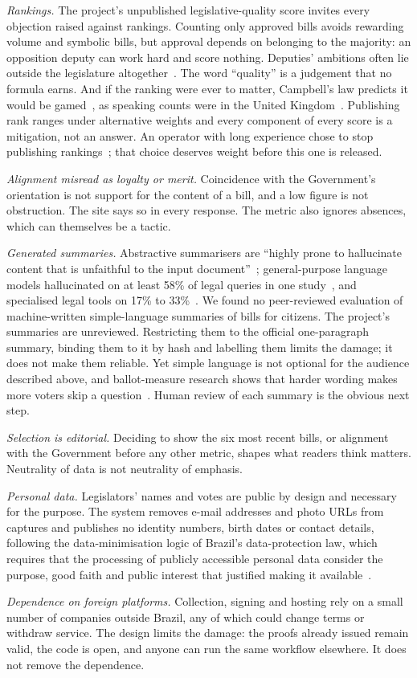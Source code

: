 \emph{Rankings.} The project's unpublished legislative-quality score invites every objection raised against rankings. Counting only approved bills avoids rewarding volume and symbolic bills, but approval depends on belonging to the majority: an opposition deputy can work hard and score nothing. Deputies' ambitions often lie outside the legislature altogether~\citep{samuels2003ambition}. The word ``quality'' is a judgement that no formula earns. And if the ranking were ever to matter, Campbell's law predicts it would be gamed~\citep{campbell1979assessing}, as speaking counts were in the United Kingdom~\citep{korthagen2020parliamentary}. Publishing rank ranges under alternative weights and every component of every score is a mitigation, not an answer. An operator with long experience chose to stop publishing rankings~\citep{parsons2020publishing}; that choice deserves weight before this one is released.

\emph{Alignment misread as loyalty or merit.} Coincidence with the Government's orientation is not support for the content of a bill, and a low figure is not obstruction. The site says so in every response. The metric also ignores absences, which can themselves be a tactic.

\emph{Generated summaries.} Abstractive summarisers are ``highly prone to hallucinate content that is unfaithful to the input document''~\citep{maynez2020faithfulness}; general-purpose language models hallucinated on at least 58\% of legal queries in one study~\citep{dahl2024large}, and specialised legal tools on 17\% to 33\%~\citep{magesh2025hallucination}. We found no peer-reviewed evaluation of machine-written simple-language summaries of bills for citizens. The project's summaries are unreviewed. Restricting them to the official one-paragraph summary, binding them to it by hash and labelling them limits the damage; it does not make them reliable. Yet simple language is not optional for the audience described above, and ballot-measure research shows that harder wording makes more voters skip a question~\citep{reilly2011ballot}. Human review of each summary is the obvious next step.

\emph{Selection is editorial.} Deciding to show the six most recent bills, or alignment with the Government before any other metric, shapes what readers think matters. Neutrality of data is not neutrality of emphasis.

\emph{Personal data.} Legislators' names and votes are public by design and necessary for the purpose. The system removes e-mail addresses and photo URLs from captures and publishes no identity numbers, birth dates or contact details, following the data-minimisation logic of Brazil's data-protection law, which requires that the processing of publicly accessible personal data consider the purpose, good faith and public interest that justified making it available~\citep{brasil2018lgpd}.

\emph{Dependence on foreign platforms.} Collection, signing and hosting rely on a small number of companies outside Brazil, any of which could change terms or withdraw service. The design limits the damage: the proofs already issued remain valid, the code is open, and anyone can run the same workflow elsewhere. It does not remove the dependence.
